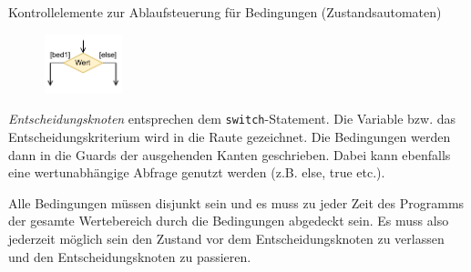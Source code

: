 \begin{defi}{Kontrollelemente zur Ablaufsteuerung für Bedingungen (Zustandsautomaten)}
    \begin{figure}
        \centering
        \includegraphics[width=0.2\textwidth]{includes/figures/defi_diagrams_state_if.pdf}
    \end{figure}
    \emph{Entscheidungsknoten} entsprechen dem \texttt{switch}-Statement.
    Die Variable bzw. das Entscheidungskriterium wird in die Raute gezeichnet.
    Die Bedingungen werden dann in die Guards der ausgehenden Kanten geschrieben.
    Dabei kann ebenfalls eine wertunabhängige Abfrage genutzt werden (z.B. else, true etc.).

    Alle Bedingungen müssen disjunkt sein und es muss zu jeder Zeit des Programms der gesamte Wertebereich durch die Bedingungen abgedeckt sein.
    Es muss also jederzeit möglich sein den Zustand vor dem Entscheidungsknoten zu verlassen und den Entscheidungsknoten zu passieren.
\end{defi}

